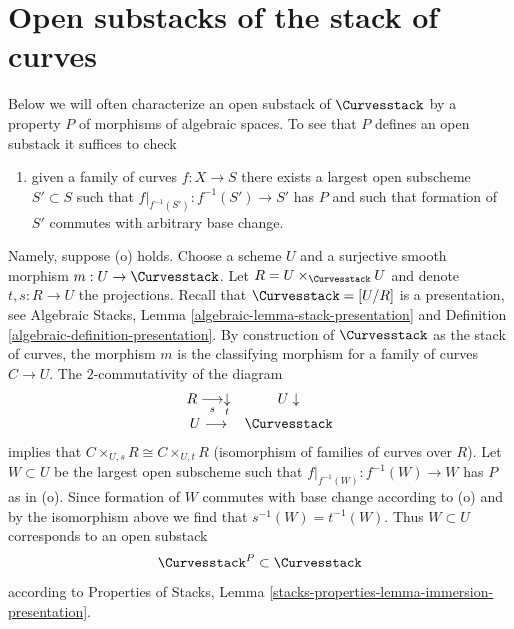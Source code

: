 \section{Open substacks of the stack of curves}
\label{moduli-curves-section-open}
Below we will often characterize an open substack of $\Curvesstack$
by a property $P$ of morphisms of algebraic spaces. To see that $P$
defines an open substack it suffices to check
\begin{enumerate}
\item[(o)] given a family of curves $f : X \to S$ there exists
a largest open subscheme $S' \subset S$ such that
$f|_{f^{-1}(S')} : f^{-1}(S') \to S'$ has $P$ and such that
formation of $S'$ commutes with arbitrary base change.
\end{enumerate}
Namely, suppose (o) holds. Choose a scheme $U$ and a surjective
smooth morphism $m : U \to \Curvesstack$. Let
$R = U \times_{\Curvesstack} U$ and denote $t, s : R \to U$
the projections. Recall that $\Curvesstack = [U/R]$ is a presentation,
see Algebraic Stacks, Lemma \ref{algebraic-lemma-stack-presentation} and
Definition \ref{algebraic-definition-presentation}.
By construction of $\Curvesstack$ as
the stack of curves, the morphism $m$ is the classifying morphism
for a family of curves $C \to U$. The $2$-commutativity
of the diagram
$$
\begin{array}{cc}R \underset{s}{\longrightarrow}\underset{t}{\downarrow} & U \downarrow \\ U \longrightarrow & \Curvesstack\end{array}
$$
implies that $C \times_{U, s} R  \cong C \times_{U, t} R$
(isomorphism of families of curves over $R$). Let $W \subset U$
be the largest open subscheme such that
$f|_{f^{-1}(W)} : f^{-1}(W) \to W$ has $P$ as in (o).
Since formation of $W$ commutes with base change according to (o)
and by the isomorphism above we find that $s^{-1}(W) = t^{-1}(W)$.
Thus $W \subset U$ corresponds to an open substack
$$
\Curvesstack^P \subset \Curvesstack
$$
according to Properties of Stacks, Lemma
\ref{stacks-properties-lemma-immersion-presentation}.

